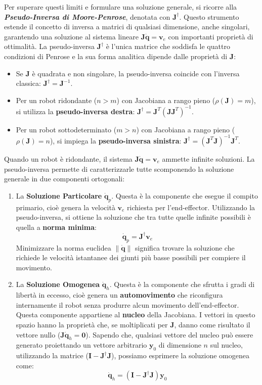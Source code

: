 ﻿\documentclass[11pt, a4paper]{article}
\begin{document}
Per superare questi limiti e formulare una soluzione generale, si ricorre alla \textbf{\textit{Pseudo-Inversa di Moore-Penrose}}, denotata con \(\bm{J}^{\dagger}\). Questo strumento estende il concetto di inversa a matrici di qualsiasi dimensione, anche singolari, garantendo una soluzione al sistema lineare \(\bm{J}\dot{\bm{q}} = \bm{v}_e\) con importanti proprietà di ottimalità. La pseudo-inversa \(\bm{J}^\dagger\) è l'unica matrice che soddisfa le quattro condizioni di Penrose e la sua forma analitica dipende dalle proprietà di \(\bm{J}\):
\begin{itemize}
    \item Se \(\bm{J}\) è quadrata e non singolare, la pseudo-inversa coincide con l'inversa classica: \(\bm{J}^\dagger = \bm{J}^{-1}\).
    \item Per un robot ridondante (\(n > m\)) con Jacobiana a rango pieno (\(\rho(\bm{J}) = m\)), si utilizza la \textbf{pseudo-inversa destra}: \( \bm{J}^\dagger = \bm{J}^T(\bm{J}\bm{J}^T)^{-1} \).
    \item Per un robot sottodeterminato (\(m > n\)) con Jacobiana a rango pieno (\(\rho(\bm{J}) = n\)), si impiega la \textbf{pseudo-inversa sinistra}: \( \bm{J}^\dagger = (\bm{J}^T\bm{J})^{-1}\bm{J}^T \).
\end{itemize}
Quando un robot è ridondante, il sistema \(\bm{J}\dot{\bm{q}} = \bm{v}_e\) ammette infinite soluzioni. La pseudo-inversa permette di caratterizzarle tutte scomponendo la soluzione generale in due componenti ortogonali:
\begin{enumerate}
    \item La \textbf{Soluzione Particolare} \(\dot{\bm{q}}_p\). Questa è la componente che esegue il compito primario, cioè genera la velocità \(\bm{v}_e\) richiesta per l'end-effector. Utilizzando la pseudo-inversa, si ottiene la soluzione che tra tutte quelle infinite possibili è quella a \textbf{norma minima}:
    \[
        \dot{\bm{q}}_p = \bm{J}^{\dagger}\bm{v}_e
    \]
    Minimizzare la norma euclidea \(\|\dot{\bm{q}}\|\) significa trovare la soluzione che richiede le velocità istantanee dei giunti più basse possibili per compiere il movimento.

    \item La \textbf{Soluzione Omogenea} \(\dot{\bm{q}}_h\). Questa è la componente che sfrutta i gradi di libertà in eccesso, cioè genera un \textbf{automovimento} che riconfigura internamente il robot senza produrre alcun movimento dell'end-effector. Questa componente appartiene al \textbf{nucleo} della Jacobiana. I vettori in questo spazio hanno la proprietà che, se moltiplicati per \(\bm{J}\), danno come risultato il vettore nullo (\(\bm{J}\dot{\bm{q}}_h = \bm{0}\)). Sapendo che, qualsiasi vettore del nucleo può essere generato proiettando un vettore arbitrario \(\bm{y}_0\) di dimensione \(n\) sul nucleo, utilizzando la matrice (\(\bm{I} - \bm{J}^{\dagger}\bm{J}\)), possiamo esprimere la soluzione omogenea come:
    \[
        \dot{\bm{q}}_h = (\bm{I} - \bm{J}^{\dagger}\bm{J})\bm{y}_0
    \]
\end{enumerate}
\end{document}
